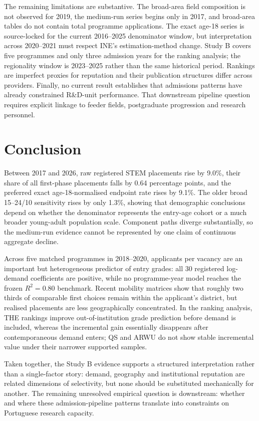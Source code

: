 \documentclass[11pt,a4paper]{article}
\begin{document}
The remaining limitations are substantive. The broad-area field composition is not observed for 2019, the medium-run series begins only in 2017, and broad-area tables do not contain total programme applications. The exact age-18 series is source-locked for the current 2016--2025 denominator window, but interpretation across 2020--2021 must respect INE's estimation-method change. Study B covers five programmes and only three admission years for the ranking analysis; the regionality window is 2023--2025 rather than the same historical period. Rankings are imperfect proxies for reputation and their publication structures differ across providers. Finally, no current result establishes that admissions patterns have already constrained R\&D-unit performance. That downstream pipeline question requires explicit linkage to feeder fields, postgraduate progression and research personnel.

\section{Conclusion}
Between 2017 and 2026, raw registered STEM placements rise by 9.0\%, their share of all first-phase placements falls by 0.64 percentage points, and the preferred exact age-18-normalised endpoint rate rises by 9.1\%. The older broad 15--24/10 sensitivity rises by only 1.3\%, showing that demographic conclusions depend on whether the denominator represents the entry-age cohort or a much broader young-adult population scale. Component paths diverge substantially, so the medium-run evidence cannot be represented by one claim of continuous aggregate decline.

Across five matched programmes in 2018--2020, applicants per vacancy are an important but heterogeneous predictor of entry grades: all 30 registered log-demand coefficients are positive, while no programme-year model reaches the frozen $R^2=0.80$ benchmark. Recent mobility matrices show that roughly two thirds of comparable first choices remain within the applicant's district, but realised placements are less geographically concentrated. In the ranking analysis, THE rankings improve out-of-institution grade prediction before demand is included, whereas the incremental gain essentially disappears after contemporaneous demand enters; QS and ARWU do not show stable incremental value under their narrower supported samples.

Taken together, the Study B evidence supports a structured interpretation rather than a single-factor story: demand, geography and institutional reputation are related dimensions of selectivity, but none should be substituted mechanically for another. The remaining unresolved empirical question is downstream: whether and where these admission-pipeline patterns translate into constraints on Portuguese research capacity.
\end{document}
